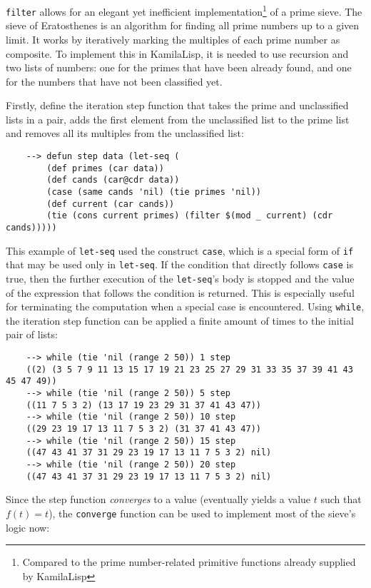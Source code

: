 \verb|filter| allows for an elegant yet inefficient implementation\footnote{Compared to the prime number-related primitive functions already supplied by KamilaLisp} of a prime sieve. The sieve of Eratosthenes is an algorithm for finding all prime numbers up to a given limit. It works by iteratively marking the multiples of each prime number as composite. To implement this in KamilaLisp, it is needed to use recursion and two lists of numbers: one for the primes that have been already found, and one for the numbers that have not been classified yet.

Firstly, define the iteration step function that takes the prime and unclassified lists in a pair, adds the first element from the unclassified list to the prime list and removes all its multiples from the unclassified list:

\begin{Verbatim}
    --> defun step data (let-seq (
        (def primes (car data))
        (def cands (car@cdr data))
        (case (same cands 'nil) (tie primes 'nil))
        (def current (car cands))
        (tie (cons current primes) (filter $(mod _ current) (cdr cands)))))
\end{Verbatim}

This example of \verb|let-seq| used the construct \verb|case|, which is a special form of \verb|if| that may be used only in \verb|let-seq|. If the condition that directly follows \verb|case| is true, then the further execution of the \verb|let-seq|'s body is stopped and the value of the expression that follows the condition is returned. This is especially useful for terminating the computation when a special case is encountered. Using \verb|while|, the iteration step function can be applied a finite amount of times to the initial pair of lists:

\begin{Verbatim}
    --> while (tie 'nil (range 2 50)) 1 step
    ((2) (3 5 7 9 11 13 15 17 19 21 23 25 27 29 31 33 35 37 39 41 43 45 47 49))
    --> while (tie 'nil (range 2 50)) 5 step
    ((11 7 5 3 2) (13 17 19 23 29 31 37 41 43 47))
    --> while (tie 'nil (range 2 50)) 10 step
    ((29 23 19 17 13 11 7 5 3 2) (31 37 41 43 47))
    --> while (tie 'nil (range 2 50)) 15 step
    ((47 43 41 37 31 29 23 19 17 13 11 7 5 3 2) nil)
    --> while (tie 'nil (range 2 50)) 20 step
    ((47 43 41 37 31 29 23 19 17 13 11 7 5 3 2) nil)
\end{Verbatim}

Since the step function \textit{converges} to a value (eventually yields a value $t$ such that $f(t) = t$), the \verb|converge| function can be used to implement most of the sieve's logic now:

